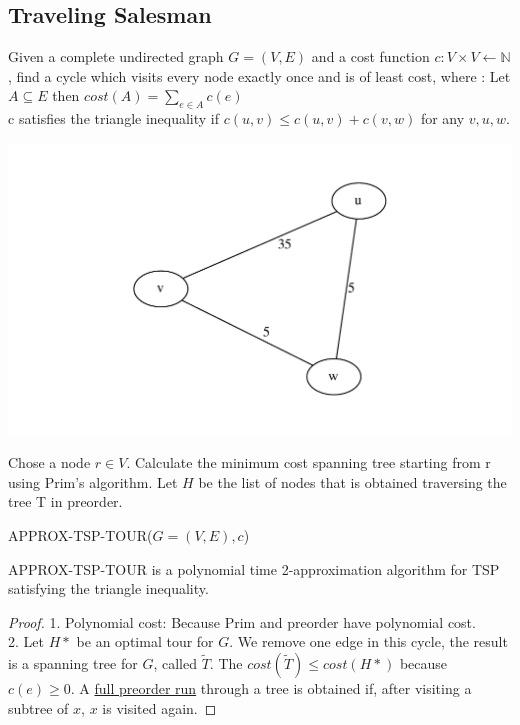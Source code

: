 \subsection{Traveling Salesman}
Given a complete undirected graph $G=(V,E)$ and a cost function $c:V \times V \gets \mathbb{N}$,
find a cycle which visits every node exactly once and is of least cost, where : Let $A \subseteq E$ then
$cost(A) = \sum\nolimits_{e \in A} c(e)$\\
c satisfies the triangle inequality if $c(u,v) \le c(u,v) + c(v,w)$ for any $v,u,w$.
\begin{example*}
\includegraphics[width=\textwidth]{diagrams/Chapter7_Example2.pdf}
\end{example*}
\begin{algorithm}
\begin{algorithmic}[1]
\State Chose a node $r \in V$.
\State Calculate the minimum cost spanning tree starting from r using Prim's algorithm.
\State Let $H$ be the list of nodes that is obtained traversing the tree T in preorder.
\State {}
\end{algorithmic}
\caption{APPROX-TSP-TOUR($G=(V,E), c$)}
\end{algorithm}
\begin{theorem}
APPROX-TSP-TOUR is a polynomial time 2-approximation algorithm for TSP satisfying the triangle inequality.
\end{theorem}
\begin{proof}
1. Polynomial cost: Because Prim and preorder have polynomial cost.\\
2. Let $H*$ be an optimal tour for $G$. We remove one edge in this cycle, the result is a spanning tree for $G$, called $\widetilde{T}$. 
The $cost(\widetilde{T}) \le cost(H*)$ because $c(e) \ge 0$. A \underline{full preorder run} through a tree is obtained if, after visiting a subtree of $x$,
$x$ is visited again.
\end{proof}
